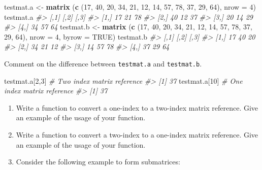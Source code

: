 \documentclass[
]{book}
\newenvironment{Shaded}{\begin{snugshade}}{\end{snugshade}}
\newcommand{\AttributeTok}[1]{\textcolor[rgb]{0.13,0.29,0.53}{#1}}
\newcommand{\CommentTok}[1]{\textcolor[rgb]{0.56,0.35,0.01}{\textit{#1}}}
\newcommand{\ConstantTok}[1]{\textcolor[rgb]{0.56,0.35,0.01}{#1}}
\newcommand{\DecValTok}[1]{\textcolor[rgb]{0.00,0.00,0.81}{#1}}
\newcommand{\FunctionTok}[1]{\textcolor[rgb]{0.13,0.29,0.53}{\textbf{#1}}}
\newcommand{\NormalTok}[1]{#1}
\newcommand{\OtherTok}[1]{\textcolor[rgb]{0.56,0.35,0.01}{#1}}
\begin{document}
\begin{Shaded}
\begin{Highlighting}[]
\NormalTok{testmat.a }\OtherTok{\textless{}{-}} \FunctionTok{matrix}\NormalTok{ (}\FunctionTok{c}\NormalTok{ (}\DecValTok{17}\NormalTok{, }\DecValTok{40}\NormalTok{, }\DecValTok{20}\NormalTok{, }\DecValTok{34}\NormalTok{, }\DecValTok{21}\NormalTok{, }\DecValTok{12}\NormalTok{, }\DecValTok{14}\NormalTok{, }\DecValTok{57}\NormalTok{, }
                        \DecValTok{78}\NormalTok{, }\DecValTok{37}\NormalTok{, }\DecValTok{29}\NormalTok{, }\DecValTok{64}\NormalTok{), }\AttributeTok{nrow =} \DecValTok{4}\NormalTok{)}
\NormalTok{testmat.a}
\CommentTok{\#\textgreater{}      [,1] [,2] [,3]}
\CommentTok{\#\textgreater{} [1,]   17   21   78}
\CommentTok{\#\textgreater{} [2,]   40   12   37}
\CommentTok{\#\textgreater{} [3,]   20   14   29}
\CommentTok{\#\textgreater{} [4,]   34   57   64}
\NormalTok{testmat.b }\OtherTok{\textless{}{-}} \FunctionTok{matrix}\NormalTok{ (}\FunctionTok{c}\NormalTok{ (}\DecValTok{17}\NormalTok{, }\DecValTok{40}\NormalTok{, }\DecValTok{20}\NormalTok{, }\DecValTok{34}\NormalTok{, }\DecValTok{21}\NormalTok{, }\DecValTok{12}\NormalTok{, }\DecValTok{14}\NormalTok{, }\DecValTok{57}\NormalTok{, }
                        \DecValTok{78}\NormalTok{, }\DecValTok{37}\NormalTok{, }\DecValTok{29}\NormalTok{, }\DecValTok{64}\NormalTok{), }\AttributeTok{nrow =} \DecValTok{4}\NormalTok{, }\AttributeTok{byrow =} \ConstantTok{TRUE}\NormalTok{)}
\NormalTok{testmat.b}
\CommentTok{\#\textgreater{}      [,1] [,2] [,3]}
\CommentTok{\#\textgreater{} [1,]   17   40   20}
\CommentTok{\#\textgreater{} [2,]   34   21   12}
\CommentTok{\#\textgreater{} [3,]   14   57   78}
\CommentTok{\#\textgreater{} [4,]   37   29   64}
\end{Highlighting}
\end{Shaded}

Comment on the difference between \texttt{testmat.a} and \texttt{testmat.b}.

\begin{Shaded}
\begin{Highlighting}[]
\NormalTok{testmat.a[}\DecValTok{2}\NormalTok{,}\DecValTok{3}\NormalTok{]   }\CommentTok{\# Two index matrix reference}
\CommentTok{\#\textgreater{} [1] 37}
\NormalTok{testmat.a[}\DecValTok{10}\NormalTok{]   }\CommentTok{\# One index matrix reference}
\CommentTok{\#\textgreater{} [1] 37}
\end{Highlighting}
\end{Shaded}

\begin{enumerate}
\def\labelenumi{(\alph{enumi})}
\setcounter{enumi}{4}
\item
  Write a function to convert a one-index to a two-index matrix reference. Give an example of the usage of your function.
\item
  Write a function to convert a two-index to a one-index matrix reference. Give an example of the usage of your function.
\item
  Consider the following example to form submatrices:
\end{enumerate}
\end{document}
